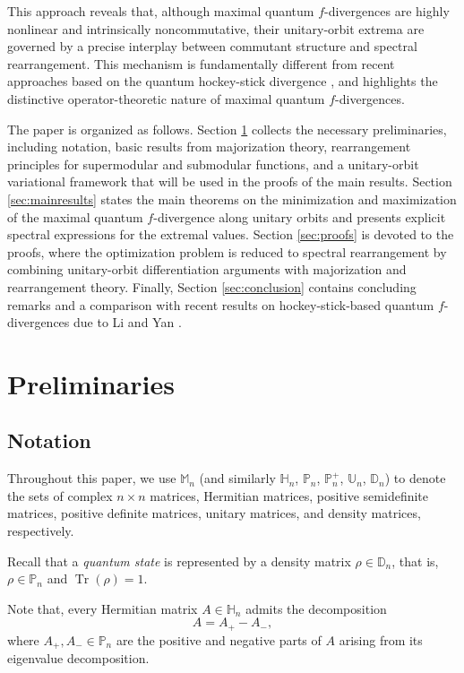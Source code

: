 \documentclass[10pt,reqno]{amsart}
\theoremstyle{break-italic}
\theoremstyle{break-italic}
\theoremstyle{break-italic}
\theoremstyle{break-italic}
\theoremstyle{break-italic}
\theoremstyle{break-italic}
\theoremstyle{break-italic}
\theoremstyle{break-italic}
\theoremstyle{break-roman}
\theoremstyle{standard}
\theoremstyle{varthm-roman}
\theoremstyle{varthm-italic}
\theoremstyle{varthm-roman-break}
\theoremstyle{varthm-italic-break}
\theoremstyle{varthm-roman-no-punctuation}
\theoremstyle{varthm-italic-no-punctuation}
\numberwithin{equation}{section}
\begin{document}
This approach reveals that, although maximal quantum $f$-divergences are highly nonlinear and intrinsically noncommutative, their unitary-orbit extrema are governed by a precise interplay between commutant structure and spectral rearrangement. This mechanism is fundamentally different from recent approaches based on the quantum hockey-stick divergence \cite{HirTo,LiYan}, and highlights the distinctive operator-theoretic nature of maximal quantum $f$-divergences.

The paper is organized as follows. Section \ref{subsec:majorization} collects the necessary preliminaries, including notation, basic results from majorization theory, rearrangement principles for supermodular and submodular functions, and a unitary-orbit variational framework that will be used in the proofs of the main results. Section \ref{sec:mainresults} states the main theorems on the minimization and maximization
of the maximal quantum $f$-divergence along unitary orbits and presents explicit spectral expressions for the extremal values. Section \ref{sec:proofs} is devoted to the proofs, where the optimization problem is
reduced to spectral rearrangement by combining unitary-orbit differentiation arguments with majorization and rearrangement theory. Finally, Section \ref{sec:conclusion} contains concluding remarks and a comparison with
recent results on hockey-stick-based quantum $f$-divergences due to Li and Yan \cite{LiYan}.

 


\section{Preliminaries}\label{subsec:majorization}

\subsection{Notation}

Throughout this paper, we use $\mathbb{M}_n$ (and similarly $\mathbb{H}_n$, $\mathbb{P}_n$, $\mathbb{P}_n^+$, $\mathbb{U}_n$, $\mathbb{D}_n$) to denote the sets of complex $n\times n$ matrices, Hermitian matrices, positive semidefinite matrices, positive definite matrices, unitary matrices, and density matrices, respectively. 

Recall that a \textit{quantum state} is represented by a density matrix $\rho  \in \mathbb{D}_n$, that is,  $\rho \in \mathbb{P}_n$ and $\operatorname{Tr}(\rho) = 1$. 

Note that, every Hermitian matrix $A \in \mathbb{H}_n$ admits the decomposition
\[
A = A_+ - A_-,
\]
where $A_+, A_- \in \mathbb{P}_n$ are the positive and negative parts of $A$ arising from its eigenvalue decomposition. 
\end{document}
